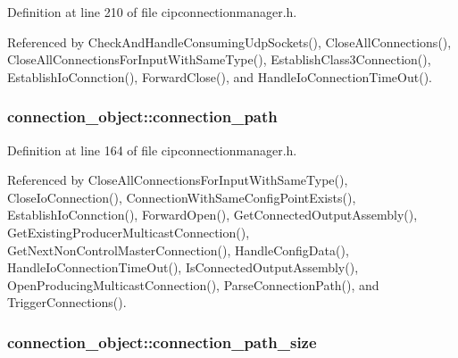 \-Definition at line 210 of file cipconnectionmanager.\-h.



\-Referenced by \-Check\-And\-Handle\-Consuming\-Udp\-Sockets(), \-Close\-All\-Connections(), \-Close\-All\-Connections\-For\-Input\-With\-Same\-Type(), \-Establish\-Class3\-Connection(), \-Establish\-Io\-Connction(), \-Forward\-Close(), and \-Handle\-Io\-Connection\-Time\-Out().

\hypertarget{structconnection__object_a7ea92b8fc46bb305035ed3547516e0a7}{
\subsubsection[{connection\-\_\-path}]{ {\bf connection\-\_\-object\-::connection\-\_\-path}}}\label{d1/d48/structconnection__object_a7ea92b8fc46bb305035ed3547516e0a7}


\-Definition at line 164 of file cipconnectionmanager.\-h.



\-Referenced by \-Close\-All\-Connections\-For\-Input\-With\-Same\-Type(), \-Close\-Io\-Connection(), \-Connection\-With\-Same\-Config\-Point\-Exists(), \-Establish\-Io\-Connction(), \-Forward\-Open(), \-Get\-Connected\-Output\-Assembly(), \-Get\-Existing\-Producer\-Multicast\-Connection(), \-Get\-Next\-Non\-Control\-Master\-Connection(), \-Handle\-Config\-Data(), \-Handle\-Io\-Connection\-Time\-Out(), \-Is\-Connected\-Output\-Assembly(), \-Open\-Producing\-Multicast\-Connection(), \-Parse\-Connection\-Path(), and \-Trigger\-Connections().

\hypertarget{structconnection__object_aaab602a6e09d625e3057e5d1ca8825e5}{
\subsubsection[{connection\-\_\-path\-\_\-size}]{ {\bf connection\-\_\-object\-::connection\-\_\-path\-\_\-size}}}\label{d1/d48/structconnection__object_aaab602a6e09d625e3057e5d1ca8825e5}


